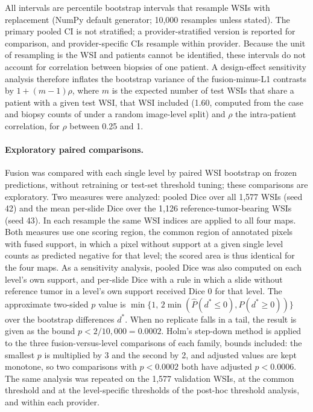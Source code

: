 \documentclass[10pt,letterpaper]{article}
\begin{document}
All intervals are percentile bootstrap intervals that resample WSIs with replacement (NumPy default generator; 10,000 resamples unless stated). The primary pooled CI is not stratified; a provider-stratified version is reported for comparison, and provider-specific CIs resample within provider. Because the unit of resampling is the WSI and patients cannot be identified, these intervals do not account for correlation between biopsies of one patient. A design-effect sensitivity analysis therefore inflates the bootstrap variance of the fusion-minus-L1 contrasts by $1+(m-1)\rho$, where $m$ is the expected number of test WSIs that share a patient with a given test WSI, that WSI included (1.60, computed from the case and biopsy counts of \cite{bib11} under a random image-level split) and $\rho$ the intra-patient correlation, for $\rho$ between 0.25 and 1.

\paragraph{Exploratory paired comparisons.}
Fusion was compared with each single level by paired WSI bootstrap on frozen predictions, without retraining or test-set threshold tuning; these comparisons are exploratory. Two measures were analyzed: pooled Dice over all 1,577 WSIs (seed 42) and the mean per-slide Dice over the 1,126 reference-tumor-bearing WSIs (seed 43). In each resample the same WSI indices are applied to all four maps. Both measures use one scoring region, the common region of annotated pixels with fused support, in which a pixel without support at a given single level counts as predicted negative for that level; the scored area is thus identical for the four maps. As a sensitivity analysis, pooled Dice was also computed on each level's own support, and per-slide Dice with a rule in which a slide without reference tumor in a level's own support received Dice 0 for that level. The approximate two-sided $p$ value is $\min\{1,\,2\min(\hat P(d^*\le 0),\hat P(d^*\ge 0))\}$ over the bootstrap differences $d^*$. When no replicate falls in a tail, the result is given as the bound $p<2/10{,}000=0.0002$. Holm's step-down method \cite{bib40,bib41} is applied to the three fusion-versus-level comparisons of each family, bounds included: the smallest $p$ is multiplied by 3 and the second by 2, and adjusted values are kept monotone, so two comparisons with $p<0.0002$ both have adjusted $p<0.0006$. The same analysis was repeated on the 1,577 validation WSIs, at the common threshold and at the level-specific thresholds of the post-hoc threshold analysis, and within each provider.
\end{document}
